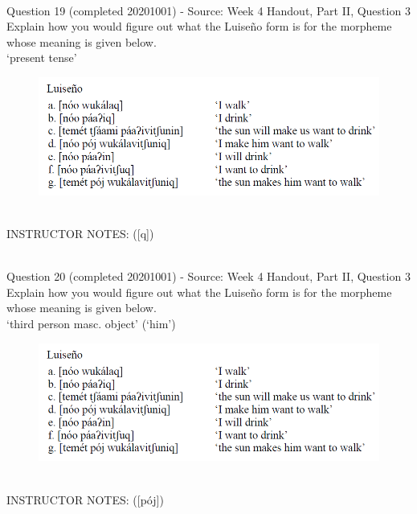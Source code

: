 \documentclass[12pt]{article}
\begin{document}
~\\

{\large Question 19} (completed 20201001) - Source: Week 4 Handout, Part II, Question 3\\

Explain how you would figure out what the Luiseño form is for the morpheme whose meaning is given below.\\

‘present tense’

\begin{figure}[H]
\includegraphics{../images/luiseno.png}
\end{figure}

~\\
INSTRUCTOR NOTES: ([q])


~\\

{\large Question 20} (completed 20201001) - Source: Week 4 Handout, Part II, Question 3\\

Explain how you would figure out what the Luiseño form is for the morpheme whose meaning is given below.\\

‘third person masc. object’ (‘him’)

\begin{figure}[H]
\includegraphics{../images/luiseno.png}
\end{figure}

~\\
INSTRUCTOR NOTES: ([pój])


~\\
\end{document}
